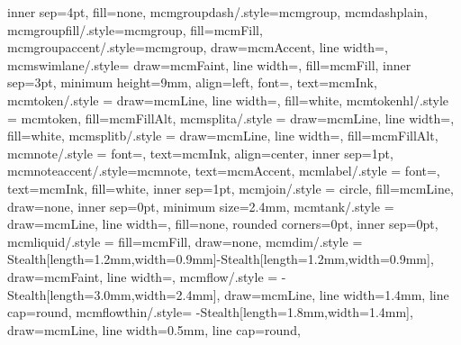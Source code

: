 {{                       inner sep=4pt, fill=none},
  mcmgroupdash/.style={mcmgroup, mcmdashplain},
  mcmgroupfill/.style={mcmgroup, fill=mcmFill},
  mcmgroupaccent/.style={mcmgroup, draw=mcmAccent, line width=\mcmsclwmain},
  mcmswimlane/.style= {draw=mcmFaint, line width=\mcmsclwthin, fill=mcmFill, inner sep=3pt,
                       minimum height=9mm, align=left, font=\footnotesize, text=mcmInk},
  mcmtoken/.style   = {draw=mcmLine, line width=\mcmsclwthin, fill=white},
  mcmtokenhl/.style = {mcmtoken, fill=mcmFillAlt},
  mcmsplita/.style  = {draw=mcmLine, line width=\mcmsclwthin, fill=white},
  mcmsplitb/.style  = {draw=mcmLine, line width=\mcmsclwthin, fill=mcmFillAlt},
  mcmnote/.style    = {font=\footnotesize, text=mcmInk, align=center, inner sep=1pt},
  mcmnoteaccent/.style={mcmnote, text=mcmAccent},
  mcmlabel/.style   = {font=\scriptsize, text=mcmInk, fill=white, inner sep=1pt},
  mcmjoin/.style    = {circle, fill=mcmLine, draw=none, inner sep=0pt, minimum size=2.4mm},
  mcmtank/.style    = {draw=mcmLine, line width=\mcmsclwmain, fill=none, rounded corners=0pt,
                       inner sep=0pt},
  mcmliquid/.style  = {fill=mcmFill, draw=none},
  mcmdim/.style     = {{Stealth[length=1.2mm,width=0.9mm]}-{Stealth[length=1.2mm,width=0.9mm]},
                       draw=mcmFaint, line width=\mcmsclwthin},
  mcmflow/.style    = {-{Stealth[length=3.0mm,width=2.4mm]}, draw=mcmLine,
                       line width=1.4mm, line cap=round},
  mcmflowthin/.style= {-{Stealth[length=1.8mm,width=1.4mm]}, draw=mcmLine,
                       line width=0.5mm, line cap=round},
}


\newcommand{\mcmedge}[3][]{\draw[mcmarrow,#1] (#2) -- (#3);}


